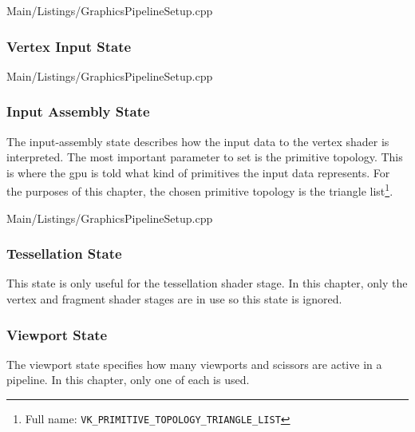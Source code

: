         
        {Main/Listings/GraphicsPipelineSetup.cpp}

      \subsubsection{Vertex Input State}
        \tbd

        
        {Main/Listings/GraphicsPipelineSetup.cpp}

      \subsubsection{Input Assembly State}
        The input-assembly state describes how the input data to the vertex shader is interpreted.
        The most important parameter to set is the primitive topology.
        This is where the \gls{gpu} is told what kind of primitives the input data represents.
        For the purposes of this chapter, the chosen primitive topology is the triangle list\footnote{Full name: \lstinline{VK_PRIMITIVE_TOPOLOGY_TRIANGLE_LIST}}.

        
        {Main/Listings/GraphicsPipelineSetup.cpp}

      \subsubsection{Tessellation State}
        This state is only useful for the tessellation shader stage.
        In this chapter, only the vertex and fragment shader stages are in use so this state is ignored.

      \subsubsection{Viewport State}
        The viewport state specifies how many viewports and scissors are active in a pipeline.
        In this chapter, only one of each is used.

